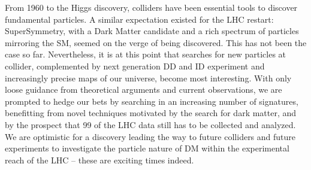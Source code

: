 From 1960 to the Higgs discovery, colliders have been essential tools to discover fundamental particles. A similar expectation existed for the LHC restart: SuperSymmetry, with a Dark Matter candidate and a rich spectrum of particles mirroring the SM, seemed on the verge of being discovered. This has not been the case so far. Nevertheless, it is at this point that searches for new particles at collider, complemented by next generation DD and ID experiment and increasingly precise maps of our universe, become most interesting. With only loose guidance from theoretical arguments and current observations, we are prompted to hedge our bets by searching in an increasing number of signatures, benefitting from novel techniques motivated by the search for dark matter, and by the prospect that 99\? of the LHC data still has to be collected and analyzed. We are optimistic for a discovery leading the way to future colliders and future experiments to investigate the particle nature of DM within the experimental reach of the LHC -- these are exciting times indeed. 